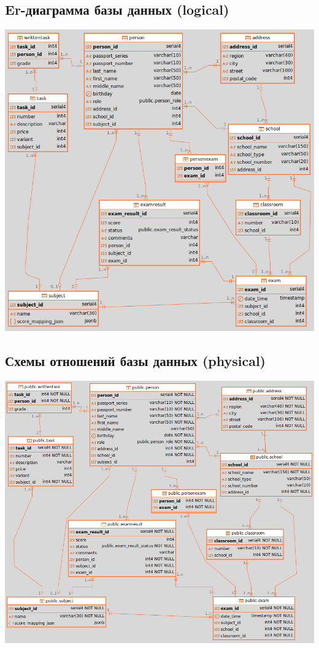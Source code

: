 \documentclass[a4paper]{article}
\begin{document}
\subsection{Er-диаграмма базы данных (logical)}
\includegraphics[width=14cm]{data/logical.png}

\subsection{Схемы отношений базы данных (physical)}
\includegraphics[width=14cm]{data/physical.png}
\end{document}
